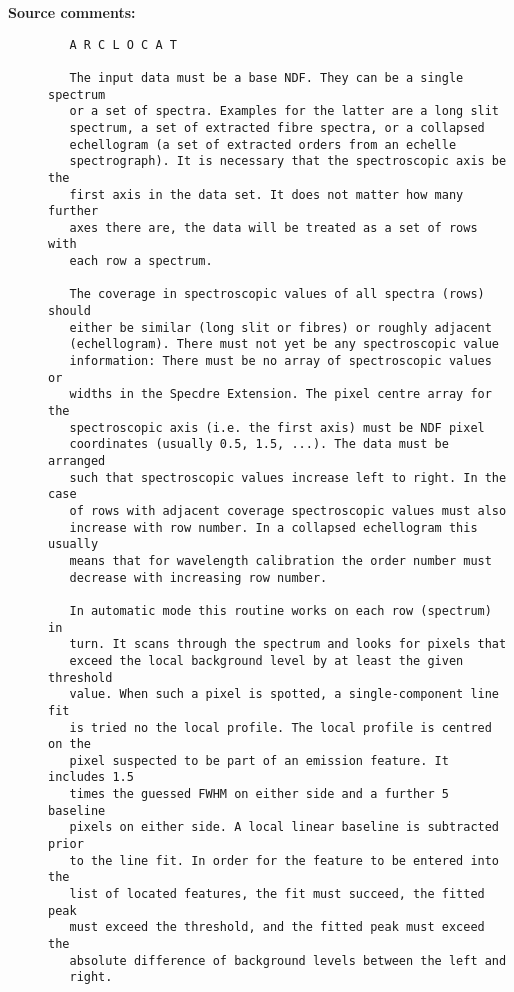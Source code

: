 \begin{description}
\begin{description}
\end{description}

\item [{\bf Source comments:}]
\begin{verbatim}
   A R C L O C A T

   The input data must be a base NDF. They can be a single spectrum
   or a set of spectra. Examples for the latter are a long slit
   spectrum, a set of extracted fibre spectra, or a collapsed
   echellogram (a set of extracted orders from an echelle
   spectrograph). It is necessary that the spectroscopic axis be the
   first axis in the data set. It does not matter how many further
   axes there are, the data will be treated as a set of rows with
   each row a spectrum.

   The coverage in spectroscopic values of all spectra (rows) should
   either be similar (long slit or fibres) or roughly adjacent
   (echellogram). There must not yet be any spectroscopic value
   information: There must be no array of spectroscopic values or
   widths in the Specdre Extension. The pixel centre array for the
   spectroscopic axis (i.e. the first axis) must be NDF pixel
   coordinates (usually 0.5, 1.5, ...). The data must be arranged
   such that spectroscopic values increase left to right. In the case
   of rows with adjacent coverage spectroscopic values must also
   increase with row number. In a collapsed echellogram this usually
   means that for wavelength calibration the order number must
   decrease with increasing row number.

   In automatic mode this routine works on each row (spectrum) in
   turn. It scans through the spectrum and looks for pixels that
   exceed the local background level by at least the given threshold
   value. When such a pixel is spotted, a single-component line fit
   is tried no the local profile. The local profile is centred on the
   pixel suspected to be part of an emission feature. It includes 1.5
   times the guessed FWHM on either side and a further 5 baseline
   pixels on either side. A local linear baseline is subtracted prior
   to the line fit. In order for the feature to be entered into the
   list of located features, the fit must succeed, the fitted peak
   must exceed the threshold, and the fitted peak must exceed the
   absolute difference of background levels between the left and
   right.


\end{verbatim}
\end{description}
